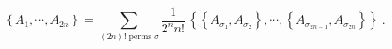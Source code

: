 \begin{equation}
\left\{  A_{1},\cdots,A_{2n}\right\}  =\sum_{\left(  2n\right)
!\;\text{perms}\;\sigma}\frac{1}{2^{n}n!}\,\left\{  \left\{  A_{\sigma_{1}%
},A_{\sigma_{2}}\right\}  ,\cdots,\left\{  A_{\sigma_{2n-1}},A_{\sigma_{2n}%
}\right\}  \right\}  \;.
\end{equation}

